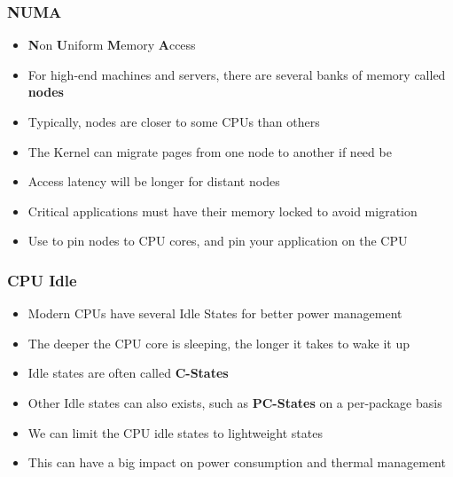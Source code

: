 \begin{frame}
	\frametitle{NUMA}
	\begin{itemize}
		\item \textbf{N}on \textbf{U}niform \textbf{M}emory \textbf{A}ccess
		\item For high-end machines and servers, there are several banks of memory called \textbf{nodes}
		\item Typically, nodes are closer to some CPUs than others 
		\item The Kernel can migrate pages from one node to another if need be
		\item Access latency will be longer for distant nodes
		\item Critical applications must have their memory locked to avoid migration
		\item Use  to pin nodes to CPU cores, and pin your application on the CPU
	\end{itemize}
\end{frame}

\begin{frame}
	\frametitle{CPU Idle}
	\begin{itemize}
		\item Modern CPUs have several Idle States for better power management
		\item The deeper the CPU core is sleeping, the longer it takes to wake it up
		\item Idle states are often called \textbf{C-States}
		\item Other Idle states can also exists, such as \textbf{PC-States} on a per-package basis
		\item We can limit the CPU idle states to lightweight states
		\item This can have a big impact on power consumption and thermal management
	\end{itemize}
\end{frame}

